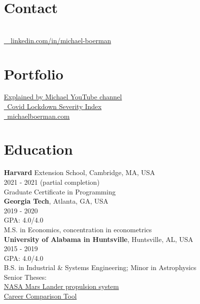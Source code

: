 \documentclass[margin,line]{res}
\begin{document}

\begin{resume}
\section{\sc Contact}
\vspace{.05in}

 \\
\faLinkedinIn  \href{https://wwwlinkedin.com/in/michael-boerman}{\ttfamily \, \, linkedin.com/in/michael-boerman}\\

\section{\sc Portfolio}
 \href{https://www.youtube.com/channel/UCxFMrMb6PrS7SOrQi-BfMUw/videos?view=0&sort=p&flow=grid}{ Explained by Michael YouTube channel}\\
\faChartLine \href{https://github.com/michaelboerman/lockdown_severity_index#readme}{\, Covid Lockdown Severity Index}\\
\faMediumM \href{https://michaelboerman.com/}{\ttfamily  \, michaelboerman.com}\\


\section{\sc Education}
{\bf Harvard} Extension School, Cambridge, MA, USA\\
2021 - 2021 (partial completion)\\
Graduate Certificate in Programming\\

{\bf Georgia Tech}, Atlanta, GA, USA\\
2019 - 2020\\
GPA: 4.0/4.0\\
M.S. in Economics, concentration in econometrics\\

{\bf University of Alabama in Huntsville}, Huntsville, AL, USA\\
2015 - 2019\\
GPA: 4.0/4.0\\
B.S. in Industrial \& Systems Engineering; Minor in Astrophysics\\
Senior Theses: \\
\hspace{5mm}{\it -- Systems Engineering:} \href{https://tinyurl.com/ISEEM-SD}{NASA Mars Lander propulsion system}\\
\hspace{5mm}{\it -- Economic Decision Analysis:} \href{http://tinyurl.com/BoermanCareerChoice
}{Career Comparison Tool}


\end{resume}
\end{document}
